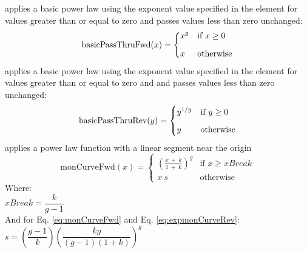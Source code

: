 \begin{xmlfields}
\begin{xmlfields}
            \xmlitemd["basicPassThruFwd"] applies a basic power law using the exponent value specified in the  element for values greater than or equal to zero and passes values less than zero unchanged:
                \begin{equation} \label{eq:expbasicPassThruFwd}
                    \text{basicPassThruFwd}(x) = 
                        \begin{dcases}
                            x^{g} & \text{if } x \geq 0 \\[6pt]
                            x & \text{otherwise}
                        \end{dcases}                \end{equation}          
            \xmlitemd["basicPassThruRev"] applies a basic power law using the exponent value specified in the  element for values greater than or equal to zero and and passes values less than zero unchanged:
                \begin{equation} \label{eq:expbasicPassThruRev}
                    \text{basicPassThruRev}(y) = 
                        \begin{dcases}
                            y^{1/g} & \text{if } y \geq 0 \\[6pt]
                            y & \text{otherwise}
                        \end{dcases}
                \end{equation}              
            \xmlitemd["monCurveFwd"] applies a power law function with a linear segment near the origin
                \begin{equation} \label{eq:monCurveFwd}
                    \text{monCurveFwd}(x) = 
                        \begin{cases}
                            \left( \frac{x\:+\:k}{1\:+\:k} \right)^{g} & \text{if } x \geq xBreak \\[8pt]
                            x\:s & \text{otherwise}
                        \end{cases}
                \end{equation}
                \tabto{0.5in} Where: \\[4pt]
                \tabto{1.0in} $xBreak = \dfrac{k}{g-1}$ \\[20pt]
                \tabto{0.5in} And for Eq. \ref{eq:monCurveFwd} and Eq. \ref{eq:expmonCurveRev}: \\[14pt]
                \tabto{1.0in} $s = \left(\dfrac{g-1}{k}\right)  \left(\dfrac{k g}{(g-1)(1+k)}\right)^{g}$

\end{xmlfields}
\end{xmlfields}
